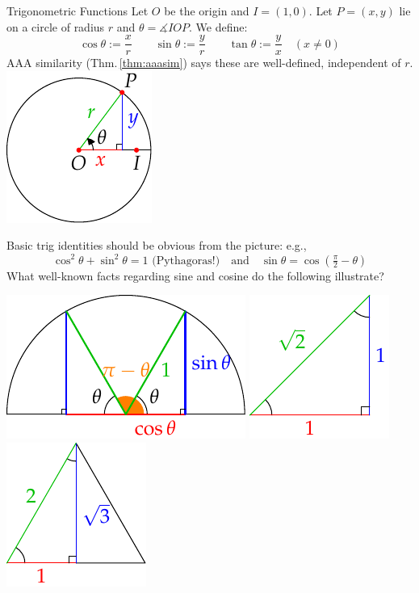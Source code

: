 \begin{defn}[lower separated=false, sidebyside, sidebyside align=top seam, sidebyside gap=0pt, righthand width=0.23\linewidth]{Trigonometric Functions}{}
	Let $O$ be the origin and $I=(1,0)$. Let $P=(x,y)$ lie on a circle of radius $r$ and $\theta=\measuredangle IOP$. We define:
	\[
		\cos\theta :=\frac xr\qquad \sin\theta:=\frac yr\qquad \tan\theta:=\frac yx\quad (x\neq 0)
	\]
	AAA similarity (Thm.\,\ref{thm:aaasim}) says these are well-defined, independent of $r$.
	\tcblower
	\flushright
	\includegraphics[scale=0.95]{angles-sine}
\end{defn}

\begin{example}{}{}
	Basic trig identities should be obvious from the picture: e.g.,
	\[
		\cos^2\theta+\sin^2\theta=1 \text{ (Pythagoras!)}
		\quad\text{and}\quad
		\sin\theta=\cos(\tfrac\pi 2-\theta)
	\]
	What well-known facts regarding sine and cosine do the following illustrate?
	\begin{center}
		\includegraphics[scale=0.95]{angles-trigbasic1}
		\qquad
		\includegraphics[scale=0.95]{angles-trigbasic2}
		\qquad
		\includegraphics[scale=0.95]{angles-trigbasic3}
	\end{center}
\end{example}


